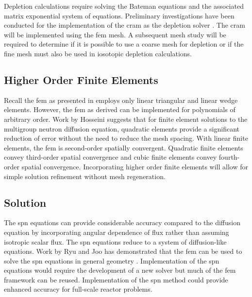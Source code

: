     Depletion calculations require solving the Bateman equations and the
    associated matrix exponential system of equations. Preliminary 
    investigations have been conducted for the
    implementation of the \gls{cram} as the depletion solver \cite{cram}. The 
    \gls{cram} will be implemented using the \gls{fem} mesh. A subsequent mesh 
    study will be required to determine if it is possible to use a coarse mesh 
    for depletion or if the fine mesh must also be used in iosotopic depletion 
    calculations.

  \subsection{Higher Order Finite Elements}
    Recall the \gls{fem} as presented in  employs
    only linear triangular and linear wedge elements. However, the \gls{fem} as 
    derived can be implemented for polynomials of arbitrary order. Work by 
    Hosseini \cite{Hosseini2013} suggests that for finite element solutions to 
    the multigroup neutron diffusion equation, quadratic elements provide a 
    significant reduction of error without the need to reduce the mesh spacing. 
    With linear finite elements, the \gls{fem} is second-order spatially 
    convergent. Quadratic finite elements convey third-order spatial convergence 
    and cubic finite elements convey fourth-order spatial convergence. 
    Incorporating higher order finite elements will allow for simple solution 
    refinement without mesh regeneration.

  \subsection{\texorpdfstring{}{Simplified PN} Solution}
    The \gls{spn} equations can provide considerable accuracy compared to the
    diffusion equation by incorporating angular dependence of flux rather than
    assuming isotropic scalar flux. The \gls{spn} equations reduce to a system
    of diffusion-like equations. Work by Ryu and Joo has demonstrated that the
    \gls{fem} can be used to solve the \gls{spn} equations in general geometry
    \cite{Ryu2013}.
    Implementation of the \gls{spn} equations would require the development of a
    new solver but much of the \gls{fem} framework can be reused. Implementation
    of the \gls{spn} method could provide enhanced accuracy for full-scale
    reactor problems.

